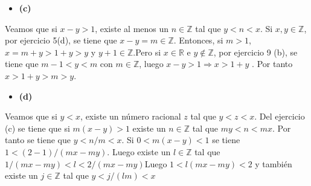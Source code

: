 \documentclass{article}
\begin{document}
\begin{itemize}
\item \bf (c) \rm
\end{itemize}
Veamos que si $x-y>1$, existe al menos un $n\in \mathbb{Z}$ tal que  $y<n<x$. Si $x,y\in\mathbb{Z}$, por ejercicio 5(d), se tiene que $x-y=m\in\mathbb{Z}$. Entonces, si $m>1$, $ x=m+y>1+y>y$ y $y+1\in \mathbb{Z}$.Pero si $x\in\mathbb{R}$ e $y\notin\mathbb{Z}$, por ejercicio 9 (b), se tiene que $m-1<y<m$ con $m\in \mathbb{Z}$, luego $x-y>1\Rightarrow x>1+y$ . Por tanto $x>1+y>m>y$.
\begin{itemize}
\item \bf (d) \rm
\end{itemize}
Veamos que si $y<x$, existe un número racional $z$ tal que $y<z<x$. Del ejercicio (c) se tiene que si $m(x-y)>1$ existe un $n\in \mathbb{Z}$ tal que  $my<n<mx$. Por tanto se tiene que $y<n/m<x$. Si $0<m(x-y)<1$ se tiene $1<(2-1)/(mx-my)$. Luego existe un $l\in\mathbb{Z}$ tal que $1/(mx-my)<l<2/(mx-my)$Luego $1<l(mx-my)<2$ y también existe un $j\in \mathbb{Z}$ tal que $y<j/(lm)<x$
%
%
\end{document}
